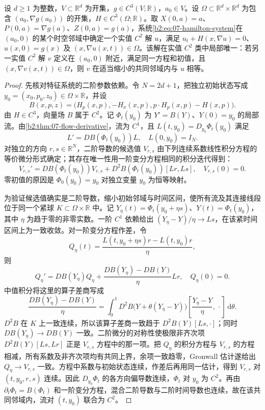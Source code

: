 \begin{proposition}\label{b2:prop:07-hamilton-local}
设 \(d\geq1\) 为整数，\(V\subset\mathbb R^d\) 为开集，\(g\in C^3(V;\mathbb R)\)，\(a_0\in V\)。设 \(\Omega\subset\mathbb R^d\times\mathbb R^d\) 为包含 \((a_0,\nabla g(a_0))\) 的开集，\(H\in C^3(\Omega;\mathbb R)\)。取 \(X(0,a)=a\)、\(P(0,a)=\nabla g(a)\)、\(Z(0,a)=g(a)\)，系统\eqref{b2:eq:07-hamilton-system}在 \((a_0,0)\) 的某个时空邻域中确定一个实值 \(C^2\) 解 \(u\)，满足 \(u_t+H(x,\nabla u)=0\)、\(u(x,0)=g(x)\) 及 \((x,\nabla u(x,t))\in\Omega\)。该解在实值 \(C^2\) 类中局部唯一：若另一实值 \(C^2\) 解 \(v\) 定义在 \((a_0,0)\) 附近，满足同一方程和初值，且 \((x,\nabla v(x,t))\in\Omega\)，则 \(v\) 在适当缩小的共同邻域内与 \(u\) 相等。
\end{proposition}
\begin{proof}
先核对特征系统的二阶参数依赖。令 \(N=2d+1\)，把独立初始状态写成 \(y_0=(x_0,p_0,z_0)\in\Omega\times\mathbb R\)，并设
\[
 B(x,p,z)=\bigl(H_p(x,p),-H_x(x,p),p\cdot H_p(x,p)-H(x,p)\bigr).
\]
由 \(H\in C^3\)，向量场 \(B\) 属于 \(C^2\)。记 \(\Phi_t(y_0)\) 为 \(Y'=B(Y)\)、\(Y(0)=y_0\) 的局部流。由\cref{b2:thm:07-flow-derivative}，流为 \(C^1\)，且 \(L(t,y_0)=D_{y_0}\Phi_t(y_0)\) 满足
\[
 L'=DB(\Phi_t(y_0))L,\quad L(0,y_0)=I_N.
\]
对独立的方向 \(r,s\in\mathbb R^N\)，二阶导数的候选值 \(V_{r,s}\) 由下列连续系数线性积分方程的等价微分形式确定；其存在唯一性用一阶变分方程相同的积分迭代得到：
\[
 V_{r,s}'=DB(\Phi_t(y_0))V_{r,s}
       +D^2B(\Phi_t(y_0))[Lr,Ls],
 \quad V_{r,s}(0)=0.
\]
零初值的原因是 \(\Phi_0(y_0)=y_0\) 对独立变量 \(y_0\) 为恒等映射。

为验证候选值确实是二阶导数，缩小初始邻域与时间区间，使所有流及其连接线段位于同一个紧球 \(K\subset\Omega\times\mathbb R\) 中。记 \(Y_\eta(t)=\Phi_t(y_0+\eta s)\)、\(Y(t)=\Phi_t(y_0)\)，其中 \(\eta\) 为趋于零的非零实数。一阶 \(C^1\) 依赖给出 \((Y_\eta-Y)/\eta\to Ls\)，在该紧时间区间上为一致收敛。对一阶变分方程作差，令
\[
 Q_\eta(t)=\frac{L(t,y_0+\eta s)r-L(t,y_0)r}{\eta},
\]
则
\[
 Q_\eta'=DB(Y_\eta)Q_\eta
       +\frac{DB(Y_\eta)-DB(Y)}{\eta}Lr,
 \quad Q_\eta(0)=0.
\]
中值积分将这里的算子差商写成
\[
 \frac{DB(Y_\eta)-DB(Y)}{\eta}
 =\int_0^1D^2B\bigl(Y+\theta(Y_\eta-Y)\bigr)
       \left[\frac{Y_\eta-Y}{\eta},\,\cdot\right]\,\mathrm{d}\theta.
\]
\(D^2B\) 在 \(K\) 上一致连续，所以该算子差商一致趋于 \(D^2B(Y)[Ls,\cdot]\)；同时 \(DB(Y_\eta)\to DB(Y)\) 一致。二阶微分的对称性使极限非齐次项 \(D^2B(Y)[Ls,Lr]\) 正是 \(V_{r,s}\) 方程中的那一项。把 \(Q_\eta\) 的积分方程与 \(V_{r,s}\) 的方程相减，所有系数及非齐次项均有共同上界，余项一致趋零，Gronwall 估计遂给出 \(Q_\eta\to V_{r,s}\) 一致。方程中系数与初始状态连续，作差后再用同一估计，得到 \(V_{r,s}\) 对 \((t,y_0,r,s)\) 连续。因此 \(D_{y_0}\Phi_t\) 的各方向偏导数连续，\(\Phi_t\) 对 \(y_0\) 为 \(C^2\)。再由 \(\partial_t\Phi_t=B(\Phi_t)\) 和一阶变分方程，混合二阶导数与二阶时间导数也连续，故在该共同邻域内，流对 \((t,y_0)\) 联合为 \(C^2\)。


\end{proof}
